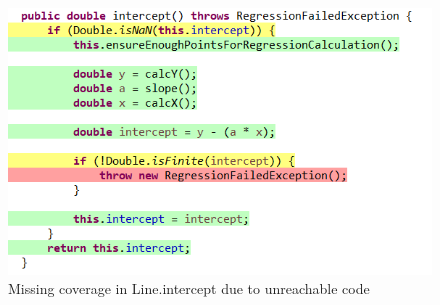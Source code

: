 \begin{figure}
    \begin{center}
        \includegraphics{img/missingcov.png}
        \caption{Missing coverage in Line.intercept due to unreachable code}
        \label{fig:missing_cov}
    \end{center}
\end{figure}